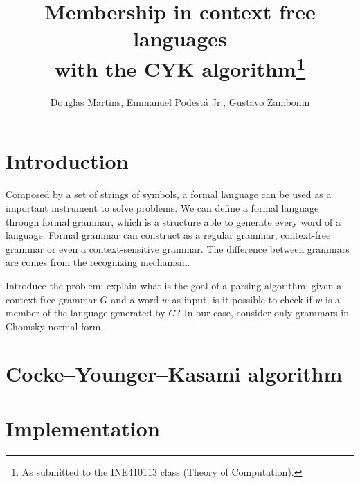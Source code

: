 \documentclass[12pt]{article}
\title{Membership in context free languages \\ with the CYK algorithm\footnote{
    As submitted to the INE410113 class (Theory of Computation).}}
\author{Douglas Martins\inst{1}, Emmanuel Podestá Jr.\inst{1}, Gustavo Zambonin\inst{1}}
\begin{document}
 

\maketitle

\section{Introduction}\label{sec:intro}
Composed by a set of strings of symbols, a formal language can be used as a important instrument to solve problems. We can define a formal language through formal grammar, which is a structure able to generate every word of a language. Formal grammar can construct as a regular grammar, context-free grammar or even a context-sensitive grammar. The difference between grammars are comes from the recognizing mechanism. 


Introduce the problem; explain what is the goal of a parsing algorithm; given a context-free grammar $G$ and a word $w$ as input, is it possible to check if $w$ is a member of the language generated by $G$? In our case, consider only grammars in Chomsky normal form.

\section{Cocke–Younger–Kasami algorithm}\label{sec:cyk}

\section{Implementation}\label{sec:imp}




\end{document}
